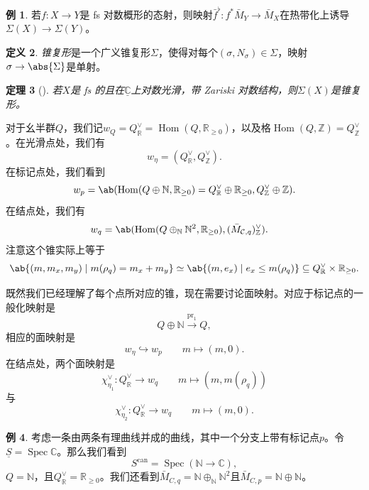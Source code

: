 \documentclass{amsart}
\newtheorem{thm}{定理}[section]
\theoremstyle{definition}
\newtheorem{defn}[thm]{定义}
\newtheorem{exm}[thm]{例}
\theoremstyle{remark}
\theoremstyle{plain}
\theoremstyle{definition}
\theoremstyle{remark}
\newcommand{\N}{\mathbb{N}}
\newcommand{\R}{\mathbb{R}}
\newcommand{\C}{\mathbb{C}}
\newcommand{\Z}{\mathbb{Z}}
\newcommand{\mc}[1]{\mathcal{#1}}
\newcommand{\on}[1]{\operatorname{#1}}
\newcommand{\ul}[1]{\underline{#1}}
\newcommand{\1}{\mathbf{1}}
\newcommand{\2}{\mathbf{2}}
\newcommand{\3}{\mathbf{3}}
\DeclareMathOperator{\Hom}{Hom}
\DeclareMathOperator{\Spec}{Spec}
\begin{document}
\begin{exm}
    若\(f \colon X \to Y\)是 fs 对数概形的态射，则映射\(\bar{f}^{\flat} \colon f^* \bar{M}_Y \to \bar{M}_X\)在热带化上诱导\(\Sigma(X) \to \Sigma(Y)\)。
\end{exm}

\begin{defn}
    \textit{锥复形}是一个广义锥复形\(\Sigma\)，使得对每个\((\sigma, N_{\sigma}) \in \Sigma\)，映射\(\sigma \to \abs{\Sigma}\)是单射。
\end{defn}

\begin{thm}[{\cite{ACP2015}}]
    若\(X\)是 fs 的且在\(\ul{\C}\)上对数光滑，带 Zariski 对数结构，则\(\Sigma(X)\)是锥复形。
\end{thm}

对于幺半群\(Q\)，我们记\(w_Q = Q_{\R}^{\vee} = \Hom(Q, \R_{\geq 0})\)，以及格\(\Hom(Q, \Z) = Q_{\Z}^{\vee}\)。在光滑点处，我们有
\[ w_{\eta} = (Q_{\R}^{\vee}, Q_{\Z}^{\vee}). \]
在标记点处，我们看到
\[ w_p = \ab(\Hom (Q \oplus \N, \R_{\geq 0}) = Q_{\R}^{\vee} \oplus \R_{\geq 0}, Q_{\Z}^{\vee}\oplus \Z). \]
在结点处，我们有
\begin{align*}
    w_q &= \ab(\Hom(Q \oplus_{\N} \N^2, \R_{\geq 0}), ( \bar{M}_{\mc{C}, q} )_{\Z}^{\vee}).
\end{align*}
注意这个锥实际上等于
\[ \ab\{(m, m_x, m_y) \mid m(\rho_q) = m_x + m_y \} \simeq \ab\{(m, e_x) \mid e_x \leq m(\rho_q) \} \subseteq Q_{\R}^{\vee} \times \R_{\geq 0}. \]

既然我们已经理解了每个点所对应的锥，现在需要讨论面映射。对应于标记点的一般化映射是
\[ Q \oplus \N \xrightarrow{\on{pr}_1} Q, \]
相应的面映射是
\[ w_{\eta} \hookrightarrow w_p \qquad m \mapsto (m,0). \]
在结点处，两个面映射是
\[ \chi_{\eta_1}^{\vee} \colon Q_{\R}^{\vee} \to w_q \qquad m \mapsto (m, m(\rho_q)) \]
与
\[ \chi_{\eta_2}^{\vee} \colon Q_{\R}^{\vee} \to w_q \qquad m \mapsto (m, 0). \]

\begin{exm}
    考虑一条由两条有理曲线并成的曲线，其中一个分支上带有标记点\(p\)。令\(\ul{S} = \Spec \C\)。那么我们看到
    \[ S^{\on{can}} = \Spec(\N \to \C), \]
    \(Q = \N\)，且\(Q_{\R}^{\vee} = \R_{\geq 0}\)。我们还看到\(\bar{M}_{C, q} = \N \oplus_{\N} \N^2\)且\(\bar{M}_{C, p} = \N \oplus \N\)。
\end{exm}
\end{document}
